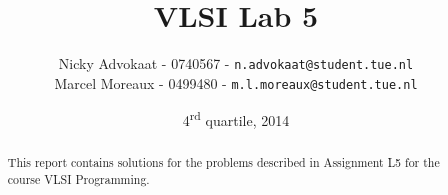 \documentclass[a4paper,twoside,11pt]{article}
\title{\vspace{-\baselineskip}\sffamily\bfseries VLSI Lab 5}
\author{
Nicky Advokaat - 0740567 - {\tt n.advokaat@student.tue.nl} \\
Marcel  Moreaux - 0499480 - {\tt  m.l.moreaux@student.tue.nl}\\
}
\date{4\textsuperscript{rd} quartile, 2014}
\numberwithin{equation}{section}
\begin{document}
\maketitle
\thispagestyle{empty}
\begin{abstract}
This report contains solutions for the problems described in Assignment L5 for the course VLSI Programming.
\end{abstract}

\tableofcontents

\newpage








\end{document}
